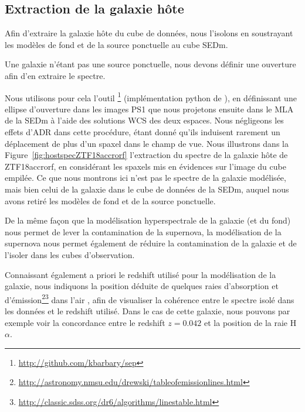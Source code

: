 \documentclass[../main/main.tex]{subfiles}
\begin{document}
\subsection{Extraction de la galaxie hôte}\label{ssec:hostextract}

Afin d'extraire la galaxie hôte du cube de données, nous l'isolons en
soustrayant les modèles de fond et de la source ponctuelle au cube SEDm.

Une galaxie n'étant pas une source ponctuelle, nous devons
définir une ouverture afin d'en extraire le spectre.

Nous utilisons pour cela l'outil \footnote{\url{http://github.com/kbarbary/sep}}
\citep{Barbary2016Sep} (implémentation python de 
\cite{Bertinsextractor}), en définissant une ellipse d'ouverture dans
les images PS1 que nous
projetons ensuite dans le MLA de la SEDm à l'aide des
solutions WCS des deux espaces. Nous négligeons
les effets d'ADR dans cette procédure, étant donné qu'ils induisent rarement un déplacement de plus d'un
spaxel dans le champ de vue. Nous illustrons dans la
Figure~\ref{fig:hostspecZTF18accrorf} l'extraction du spectre de la
galaxie hôte de ZTF18accrorf, en considérant les spaxels mis en
évidences sur l'image du cube empilée. Ce que nous montrons ici n'est
pas le spectre de la galaxie modélisée, mais bien celui de la galaxie
dans le cube de données de la SEDm, auquel nous avons retiré les modèles
de fond et de la source ponctuelle.

De la même façon que la modélisation
hyperspectrale de la galaxie (et du fond) nous permet de lever la
contamination de la supernova, la modélisation de la supernova nous
permet également de réduire la contamination de la galaxie et de
l'isoler dans les cubes d'observation.

Connaissant également a priori le redshift utilisé pour la modélisation
de la galaxie, nous indiquons la position déduite de quelques raies
d'absorption et
d'émission\footnote{\url{http://astronomy.nmsu.edu/drewski/tableofemissionlines.html}}\footnote{\url{http://classic.sdss.org/dr6/algorithms/linestable.html}}
dans l'air \citep{Morton1991}, afin de visualiser la cohérence entre le
spectre isolé dans les données et le redshift utilisé. Dans le cas de
cette galaxie, nous pouvons par exemple voir la concordance entre le redshift
$z=0.042$ et la position de la raie H$\alpha$.
\end{document}
